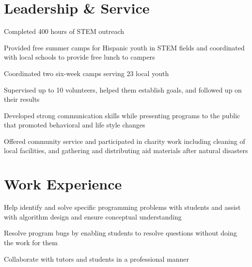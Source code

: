 \documentclass[]{deedy-resume-openfont}
\begin{document}
\begin{minipage}[t]{0.66\textwidth}
\section{Leadership \& Service}

\begin{tightemize}
\item Completed 400 hours of STEM outreach
\item Provided free summer camps for Hispanic youth in STEM fields and coordinated with local schools to provide free lunch to campers
\item Coordinated two six-week camps serving 23 local youth
\end{tightemize}
\sectionsep

\begin{tightemize}
\item Supervised up to 10 volunteers, helped them establish goals, and followed up on their results 
\item Developed strong communication skills while presenting programs to the public that promoted behavioral and life style changes
\item Offered community service and participated in charity work including cleaning of local facilities, and gathering and distributing aid materials after natural disasters
\end{tightemize}
\sectionsep

\section{Work Experience} 

\begin{tightemize}
\item Help identify and solve specific programming problems with students and assist with algorithm design and ensure conceptual understanding
\item Resolve program bugs by enabling students to resolve questions without doing the work for them
\item Collaborate with tutors and students in a professional manner
\end{tightemize}
\sectionsep


\end{minipage} 
\end{document}
